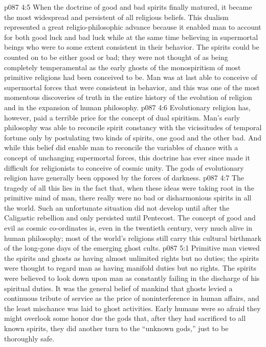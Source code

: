 \pc \vs p087 4:5 When the doctrine of good and bad spirits finally matured, it became the most widespread and persistent of all religious beliefs. This dualism represented a great religio\hyp{}philosophic advance because it enabled man to account for both good luck and bad luck while at the same time believing in supermortal beings who were to some extent consistent in their behavior. The spirits could be counted on to be either good or bad; they were not thought of as being completely temperamental as the early ghosts of the monospiritism of most primitive religions had been conceived to be. Man was at last able to conceive of supermortal forces that were consistent in behavior, and this was one of the most momentous discoveries of truth in the entire history of the evolution of religion and in the expansion of human philosophy.
\vs p087 4:6 Evolutionary religion has, however, paid a terrible price for the concept of dual spiritism. Man’s early philosophy was able to reconcile spirit constancy with the vicissitudes of temporal fortune only by postulating two kinds of spirits, one good and the other bad. And while this belief did enable man to reconcile the variables of chance with a concept of unchanging supermortal forces, this doctrine has ever since made it difficult for religionists to conceive of cosmic unity. The gods of evolutionary religion have generally been opposed by the forces of darkness.
\vs p087 4:7 The tragedy of all this lies in the fact that, when these ideas were taking root in the primitive mind of man, there really were no bad or disharmonious spirits in all the world. Such an unfortunate situation did not develop until after the Caligastic rebellion and only persisted until Pentecost. The concept of good and evil as cosmic co\hyp{}ordinates is, even in the twentieth century, very much alive in human philosophy; most of the world’s religions still carry this cultural birthmark of the long\hyp{}gone days of the emerging ghost cults.
\vs p087 5:1 Primitive man viewed the spirits and ghosts as having almost unlimited rights but no duties; the spirits were thought to regard man as having manifold duties but no rights. The spirits were believed to look down upon man as constantly failing in the discharge of his spiritual duties. It was the general belief of mankind that ghosts levied a continuous tribute of service as the price of noninterference in human affairs, and the least mischance was laid to ghost activities. Early humans were so afraid they might overlook some honor due the gods that, after they had sacrificed to all known spirits, they did another turn to the “unknown gods,” just to be thoroughly safe.\plusone

